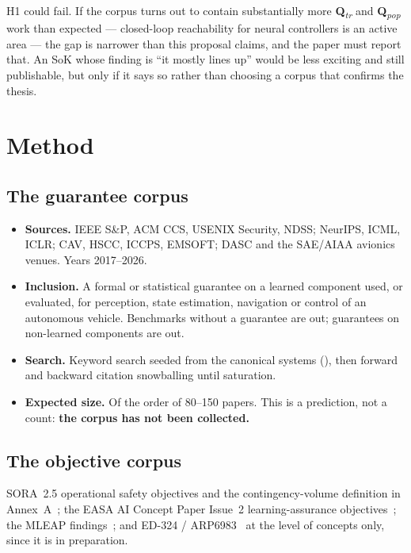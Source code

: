 \documentclass[11pt,a4paper]{article}
\newcommand{\Qlvl}[1]{\textbf{Q}\textsubscript{\textit{#1}}}
\newcommand{\Qtr}{\Qlvl{tr}}
\newcommand{\Qpop}{\Qlvl{pop}}
\begin{document}
\begin{honestly}
H1 could fail. If the corpus turns out to contain substantially more \Qtr{} and
\Qpop{} work than expected --- closed-loop reachability for neural controllers
is an active area --- the gap is narrower than this proposal claims, and the
paper must report that. An SoK whose finding is ``it mostly lines up'' would be
less exciting and still publishable, but only if it says so rather than choosing
a corpus that confirms the thesis.
\end{honestly}

\section{Method}
\label{sec:method}
\subsection{The guarantee corpus}
\begin{itemize}
\item \textbf{Sources.} IEEE S\&P, ACM CCS, USENIX Security, NDSS; NeurIPS, ICML,
  ICLR; CAV, HSCC, ICCPS, EMSOFT; DASC and the SAE/AIAA avionics venues. Years
  2017--2026.
\item \textbf{Inclusion.} A formal or statistical guarantee on a learned
  component used, or evaluated, for perception, state estimation, navigation or
  control of an autonomous vehicle. Benchmarks without a guarantee are out;
  guarantees on non-learned components are out.
\item \textbf{Search.} Keyword search seeded from the canonical systems
  (\cite{katz2017reluplex,wang2021betacrown,cohen2019smoothing,julian2016acasxu}),
  then forward and backward citation snowballing until saturation.
\item \textbf{Expected size.} Of the order of 80--150 papers. This is a
  prediction, not a count: \textbf{the corpus has not been collected.}
\end{itemize}

\subsection{The objective corpus}
SORA~2.5 operational safety objectives and the contingency-volume definition
in Annex~A~\cite{jarus_sora25}; the EASA AI Concept Paper Issue~2
learning-assurance objectives~\cite{easa_ai_concept2}; the MLEAP
findings~\cite{easa_mleap}; and ED-324 / ARP6983~\cite{ed324} at the level of
concepts only, since it is in preparation.
\end{document}
